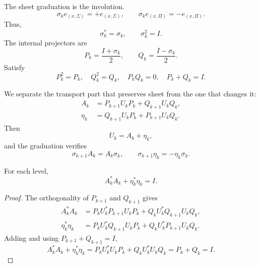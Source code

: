 The sheet graduation is the involution.
\begin{equation}
\label{eq:continuo-sp-sigma}
 \sigma_ke_{(x,\Sigma)}=+e_{(x,\Sigma)},
 \qquad
 \sigma_ke_{(x,\Pi)}=-e_{(x,\Pi)}.
\end{equation}
Thus,
\[
 \sigma_k^*=\sigma_k,
 \qquad
 \sigma_k^2=I.
\]
The internal projectors are
\begin{equation}
\label{eq:continuo-sp-p-q}
 P_k=\frac{I+\sigma_k}{2},
 \qquad
 Q_k=\frac{I-\sigma_k}{2}.
\end{equation}
Satisfy
\begin{equation}
\label{eq:continuo-sp-p-q-relaciones}
 P_k^2=P_k,
 \quad Q_k^2=Q_k,
 \quad P_kQ_k=0,
 \quad P_k+Q_k=I.
\end{equation}

We separate the transport part that preserves sheet from the one that changes it:
\begin{align}
 A_k&=P_{k+1}U_kP_k+Q_{k+1}U_kQ_k,
 \label{eq:continuo-sp-a}\\
 \eta_k&=Q_{k+1}U_kP_k+P_{k+1}U_kQ_k.
 \label{eq:continuo-sp-eta}
\end{align}
Then
\begin{equation}
\label{eq:continuo-sp-u-a-eta}
 U_k=A_k+\eta_k,
\end{equation}
and the graduation verifies
\begin{equation}
\label{eq:continuo-sp-paridad-a-eta}
 \sigma_{k+1}A_k=A_k\sigma_k,
 \qquad
 \sigma_{k+1}\eta_k=-\eta_k\sigma_k.
\end{equation}

\begin{proposition}
\label{prop:continuo-sp-balance-local}
For each level,
\begin{equation}
\label{eq:continuo-sp-balance-local}
 A_k^*A_k+\eta_k^*\eta_k=I.
\end{equation}
\end{proposition}

\begin{proof}
The orthogonality of \(P_{k+1}\) and \(Q_{k+1}\) gives
\begin{align*}
 A_k^*A_k
 &=P_kU_k^*P_{k+1}U_kP_k
   +Q_kU_k^*Q_{k+1}U_kQ_k,\\
 \eta_k^*\eta_k
 &=P_kU_k^*Q_{k+1}U_kP_k
   +Q_kU_k^*P_{k+1}U_kQ_k.
\end{align*}
Adding and using \(P_{k+1}+Q_{k+1}=I\),
\[
 A_k^*A_k+\eta_k^*\eta_k
 =P_kU_k^*U_kP_k+Q_kU_k^*U_kQ_k
 =P_k+Q_k=I.
\]
\end{proof}

